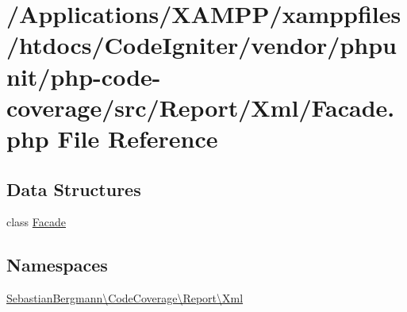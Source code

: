 \hypertarget{php-code-coverage_2src_2_report_2_xml_2_facade_8php}{}\section{/\+Applications/\+X\+A\+M\+P\+P/xamppfiles/htdocs/\+Code\+Igniter/vendor/phpunit/php-\/code-\/coverage/src/\+Report/\+Xml/\+Facade.php File Reference}
\label{php-code-coverage_2src_2_report_2_xml_2_facade_8php}
\subsection*{Data Structures}
\begin{DoxyCompactItemize}
\item 
class \mbox{\hyperlink{class_sebastian_bergmann_1_1_code_coverage_1_1_report_1_1_xml_1_1_facade}{Facade}}
\end{DoxyCompactItemize}
\subsection*{Namespaces}
\begin{DoxyCompactItemize}
\item 
 \mbox{\hyperlink{namespace_sebastian_bergmann_1_1_code_coverage_1_1_report_1_1_xml}{Sebastian\+Bergmann\textbackslash{}\+Code\+Coverage\textbackslash{}\+Report\textbackslash{}\+Xml}}
\end{DoxyCompactItemize}
